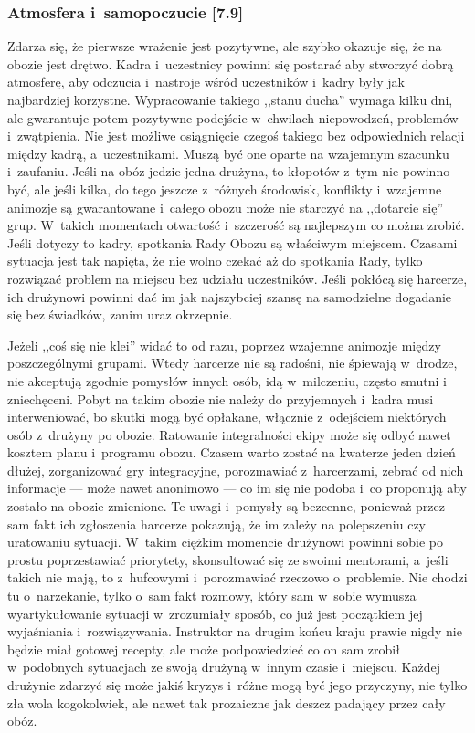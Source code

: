 \documentclass[a5paper,10pt,titlepage,twoside]{article}
\begin{document}
\subsubsection{Atmosfera i~samopoczucie [7.9]}
Zdarza się, że pierwsze wrażenie jest pozytywne, ale szybko okazuje się, że na obozie jest drętwo. Kadra i~uczestnicy powinni się postarać aby stworzyć dobrą atmosferę, aby odczucia i~nastroje wśród uczestników i~kadry były jak najbardziej korzystne. Wypracowanie takiego ,,stanu ducha'' wymaga kilku dni, ale gwarantuje potem pozytywne podejście w~chwilach niepowodzeń, problemów i~zwątpienia. Nie jest możliwe osiągnięcie czegoś takiego bez odpowiednich relacji między kadrą, a~uczestnikami. Muszą być one oparte na wzajemnym szacunku i~zaufaniu. Jeśli na obóz jedzie jedna drużyna, to kłopotów z~tym nie powinno być, ale jeśli kilka, do tego jeszcze z~różnych środowisk, konflikty i~wzajemne animozje są gwarantowane i~całego obozu może nie starczyć na ,,dotarcie się'' grup. W~takich momentach otwartość i~szczerość są najlepszym co można zrobić. Jeśli dotyczy to kadry, spotkania Rady Obozu są właściwym miejscem. Czasami sytuacja jest tak napięta, że nie wolno czekać aż do spotkania Rady, tylko rozwiązać problem na miejscu bez udziału uczestników. Jeśli pokłócą się harcerze, ich drużynowi powinni dać im jak najszybciej szansę na samodzielne dogadanie się bez świadków, zanim uraz okrzepnie.

Jeżeli ,,coś się nie klei'' widać to od razu, poprzez wzajemne animozje między poszczególnymi grupami. Wtedy harcerze nie są radośni, nie śpiewają w~drodze, nie akceptują zgodnie pomysłów innych osób, idą w~milczeniu, często smutni i zniechęceni. Pobyt na takim obozie nie należy do przyjemnych i~kadra musi interweniować, bo skutki mogą być opłakane, włącznie z~odejściem niektórych osób z~drużyny po obozie. Ratowanie integralności ekipy może się odbyć nawet kosztem planu i~programu obozu. Czasem warto zostać na kwaterze jeden dzień dłużej, zorganizować gry integracyjne, porozmawiać z~harcerzami, zebrać od nich informacje --- może nawet anonimowo --- co im się nie podoba i~co proponują aby zostało na obozie zmienione. Te uwagi i~pomysły są bezcenne, ponieważ przez sam fakt ich zgłoszenia harcerze pokazują, że im zależy na polepszeniu czy uratowaniu sytuacji. W~takim ciężkim momencie drużynowi powinni sobie po prostu poprzestawiać priorytety, skonsultować się ze swoimi mentorami, a~jeśli takich nie mają, to z~hufcowymi i~porozmawiać rzeczowo o~problemie. Nie chodzi tu o~narzekanie, tylko o~sam fakt rozmowy, który sam w~sobie wymusza wyartykułowanie sytuacji w~zrozumiały sposób, co już jest początkiem jej wyjaśniania i~rozwiązywania. Instruktor na drugim końcu kraju prawie nigdy nie będzie miał gotowej recepty, ale może podpowiedzieć co on sam zrobił w~podobnych sytuacjach ze swoją drużyną w~innym czasie i~miejscu. Każdej drużynie zdarzyć się może jakiś kryzys i~różne mogą być jego przyczyny, nie tylko zła wola kogokolwiek, ale nawet tak prozaiczne jak deszcz padający przez cały obóz.
\end{document}
